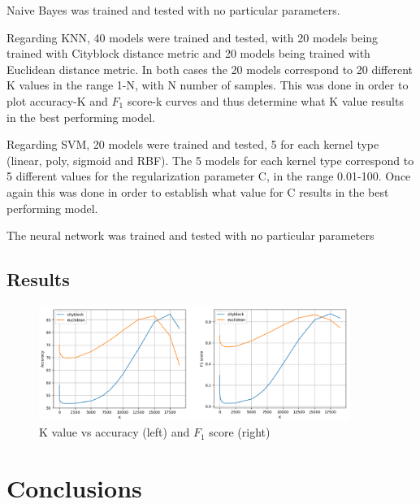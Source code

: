 \documentclass[journal,twocolumn]{IEEEtran}
\begin{document}
Naive Bayes was trained and tested with no particular parameters.

Regarding KNN, 40 models were trained and tested, with 20 models being trained with Cityblock distance metric and 20 models being trained with Euclidean distance metric. In both cases the 20 models correspond to 20 different K values in the range 1-N, with N number of samples. This was done in order to plot accuracy-K and $F_1$ score-k curves and thus determine what K value results in the best performing model.

Regarding SVM, 20 models were trained and tested, 5 for each kernel type (linear, poly, sigmoid and RBF). The 5 models for each kernel type correspond to 5 different values for the regularization parameter C, in the range 0.01-100. Once again this was done in order to establish what value for C results in the best performing model.

The neural network was trained and tested with no particular parameters


\subsection{Results}

\begin{figure}[ht]
\centering
\includegraphics[keepaspectratio,width=0.9\textwidth]{pca_nos}
\caption[K value vs accuracy and $F_1$ score]{K value vs accuracy (left) and $F_1$ score (right)}
\label{fig:k}
\end{figure}

\section{Conclusions}
\label{sec:conc}

\printbibliography

\newpage
\onecolumn
\end{document}
